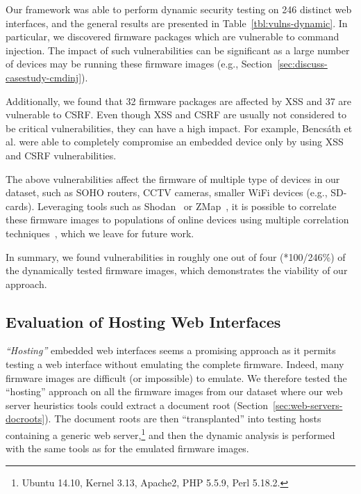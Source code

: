 \documentclass[conference]{./templates/ndss/IEEEtran}
\newcounter{t0d0_counter}
\newcounter{pr00f_counter}
\newcommand\printpercent[2]{\the\numexpr#1*100/#2\%}
\newcommand{\CountFirmwareEmulatedWebServerStarted}{246}
\newcommand{\CountFirmwareDynVulnTotal}{58}
\newcommand{\CountFirmwareDynVulnXSS}{32}
\newcommand{\CountFirmwareDynVulnCSRF}{37}
\begin{document}
Our framework was able to perform dynamic security testing on
\CountFirmwareEmulatedWebServerStarted{} distinct web interfaces, and
the general results are presented in Table~\ref{tbl:vulns-dynamic}.
In particular, we discovered \CountFirmwareDynVulnCmdInj{} firmware
packages which are vulnerable to command injection.  The impact of
such vulnerabilities can be significant as a large number of devices
may be running these firmware images (e.g.,
Section~\ref{sec:discuss-casestudy-cmdinj}).

Additionally, we found that \CountFirmwareDynVulnXSS{} firmware packages
are affected by XSS and \CountFirmwareDynVulnCSRF{} are vulnerable to CSRF. 
Even though XSS and CSRF 
are usually
not considered to be critical vulnerabilities, they can have a high
impact.  For example, Bencs{\'a}th et al.\cite{bencsath2011xcs} 
were able to
completely compromise an embedded device only by using XSS and CSRF
vulnerabilities.  

The above 
vulnerabilities affect the firmware of multiple type of 
devices in our dataset, such as SOHO routers, CCTV cameras, 
smaller WiFi devices (e.g., SD-cards). 
Leveraging tools such as Shodan~\cite{shodan} or ZMap~\cite{zmap13}, 
it is possible to correlate these firmware images to populations of online
devices using multiple correlation techniques~\cite{costin2014large}, 
which we leave for future work. 

In summary, we found vulnerabilities in roughly one out of four 
(\printpercent{\CountFirmwareDynVulnTotal}{\CountFirmwareEmulatedWebServerStarted}) 
of the dynamically tested firmware images, 
which demonstrates the viability of our approach. 


\subsection{Evaluation of Hosting Web Interfaces}
\label{sec:case-compare-host-emu}

\emph{``Hosting''} embedded web interfaces seems a promising approach
as it permits testing a web interface without emulating the complete
firmware. Indeed, many firmware images are difficult (or impossible)
to emulate. We therefore tested the ``hosting'' approach on all the firmware images
from our dataset where our web server heuristics tools could extract a document root (Section~\ref{sec:web-servers-docroots}). The document
roots are then ``transplanted'' into testing hosts containing a generic web 
server,\footnote{Ubuntu 14.10, Kernel 3.13, Apache2, PHP 5.5.9, Perl 5.18.2.} 
and then the dynamic analysis is performed with the same tools
as for the emulated firmware images.
\end{document}
